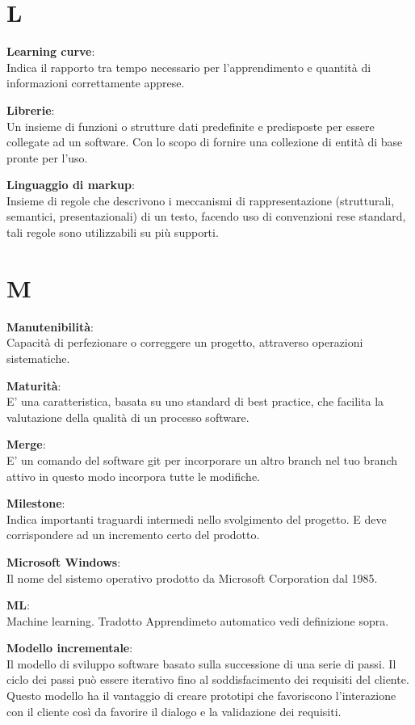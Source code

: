 \documentclass[a4paper, oneside, openany, dvipsnames, table]{article}
\begin{document}
\newpage
\section{L}
\textbf{Learning curve}:\\ Indica il rapporto tra tempo necessario per l'apprendimento e quantità di informazioni correttamente apprese.

\textbf{Librerie}:\\	Un insieme di funzioni o strutture dati predefinite e predisposte per essere collegate ad un software. Con lo scopo di fornire una collezione di entità di base pronte per l'uso.

\textbf{Linguaggio di markup}:\\	 Insieme di regole che descrivono i meccanismi di rappresentazione (strutturali, semantici, presentazionali) di un testo, facendo uso di convenzioni rese standard, tali regole sono utilizzabili su più supporti.

\newpage
\section{M}
\textbf{Manutenibilità}:\\	Capacità di perfezionare o correggere un progetto, attraverso operazioni sistematiche.

\textbf{Maturità}:\\	E' una caratteristica, basata su uno standard di best practice, che facilita la valutazione della qualità di un processo software. 

\textbf{Merge}:\\	E' un comando del software git per incorporare un altro branch nel tuo branch attivo in questo modo incorpora tutte le modifiche.

\textbf{Milestone}:\\	Indica importanti traguardi intermedi nello svolgimento del progetto. E deve corrispondere ad un incremento certo del prodotto.

\textbf{Microsoft Windows}:\\ Il nome del sistemo operativo prodotto da Microsoft Corporation dal 1985.

\textbf{ML}:\\	Machine learning. Tradotto Apprendimeto automatico vedi definizione sopra.

\textbf{Modello incrementale}:\\	Il modello di sviluppo software basato sulla successione di una serie di passi. Il ciclo dei passi può essere iterativo fino al soddisfacimento dei requisiti del cliente. Questo modello ha il vantaggio di creare prototipi che favoriscono l’interazione con il cliente così da favorire il dialogo e la validazione dei requisiti.
\end{document}
